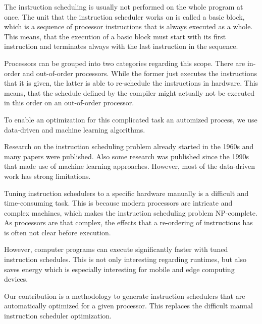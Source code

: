 The instruction scheduling is usually not performed on the whole program at once.
The unit that the instruction scheduler works on is called a basic block, which is a sequence of processor instructions that is always executed as a whole.
This means, that the execution of a basic block must start with its first instruction and terminates always with the last instruction in the sequence.

Processors can be grouped into two categories regarding this scope.
There are in-order and out-of-order processors.
While the former just executes the instructions that it is given, the latter is able to re-schedule the instructions in hardware.
This means, that the schedule defined by the compiler might actually not be executed in this order on an out-of-order processor.

To enable an optimization for this complicated task an automized process, we use data-driven and machine learning algorithms.

Research on the instruction scheduling problem already started in the 1960s and many papers were published.
Also some research was published since the 1990s that made use of machine learning approaches.
However, most of the data-driven work has strong limitations.

Tuning instruction schedulers to a specific hardware manually is a difficult and time-consuming task.
This is because modern processors are intricate and complex machines, which makes the instruction scheduling problem NP-complete.
As processors are that complex, the effects that a re-ordering of instructions has is often not clear before execution.

However, computer programs can execute significantly faster with tuned instruction schedules.
This is not only interesting regarding runtimes, but also saves energy which is especially interesting for mobile and edge computing devices.

Our contribution is a methodology to generate instruction schedulers that are automatically optimized for a given processor.
This replaces the difficult manual instruction scheduler optimization.


